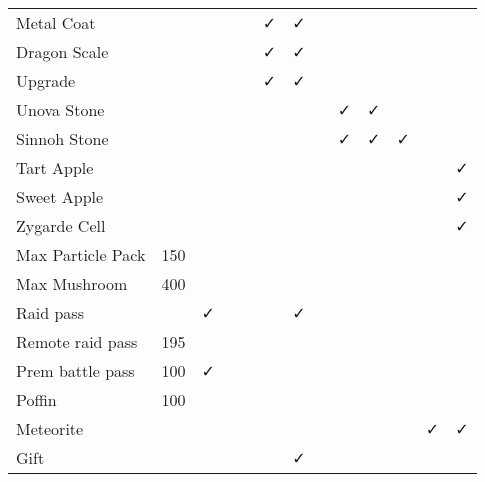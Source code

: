 \documentclass[ebook,10pt,openany,oneside]{memoir}
\begin{document}
\begin{table}
\begin{tabular}{p{}cccccccccccc}
Metal Coat        &      &   &     &    &  ✓ &  ✓  &     &     &   &   &   &   \\
Dragon Scale      &      &   &     &    &  ✓ &  ✓  &     &     &   &   &   &   \\
Upgrade           &      &   &     &    &  ✓ &  ✓  &     &     &   &   &   &   \\
Unova Stone       &      &   &     &    &    &     &     &  ✓  & ✓ &   &   &   \\
Sinnoh Stone      &      &   &     &    &    &     &     &  ✓  & ✓ & ✓ &   &   \\
Tart Apple        &      &   &     &    &    &     &     &     &   &   &   & ✓ \\ %
Sweet Apple       &      &   &     &    &    &     &     &     &   &   &   & ✓ \\ %
Zygarde Cell      &      &   &     &    &    &     &     &     &   &   &   & ✓ \\ %
Max Particle Pack & 150  &   &     &    &    &     &     &     &   &   &   &   \\
Max Mushroom      & 400  &   &     &    &    &     &     &     &   &   &   &   \\
Raid pass         &      & ✓ &     &    &    &  ✓  &     &     &   &   &   &   \\ %
Remote raid pass  & 195  &   &     &    &    &     &     &     &   &   &   &   \\
Prem battle pass  & 100  & ✓ &     &    &    &     &     &     &   &   &   &   \\
Poffin            & 100  &   &     &    &    &     &     &     &   &   &   &   \\
Meteorite         &      &   &     &    &    &     &     &     &   &   & ✓ & ✓ \\ %
Gift              &      &   &     &    &    &  ✓  &     &     &   &   &   &   \\ %

\end{tabular}
\end{table}
\end{document}

